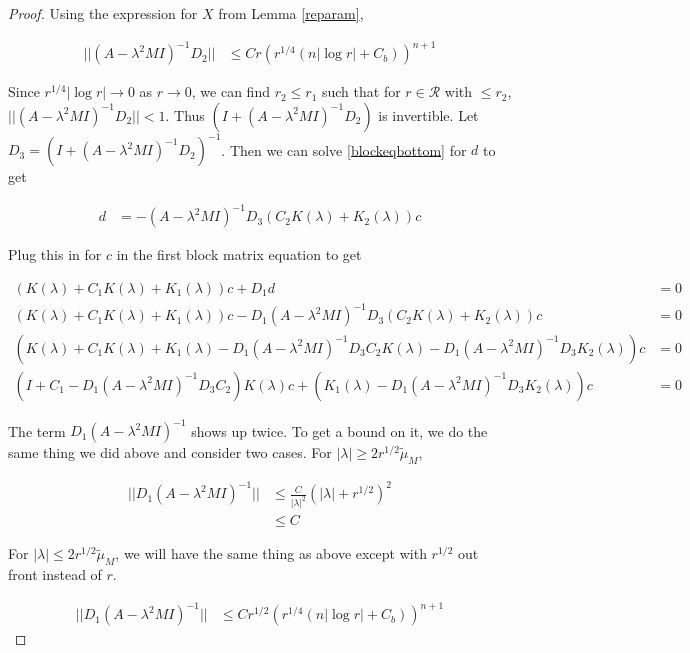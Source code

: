 \documentclass[thesis.tex]{subfiles}
\begin{document}
\begin{lemma}
\begin{proof}
Using the expression for $X$ from Lemma \ref{reparam}, 

\begin{align*}
|| (A - \lambda^2 MI)^{-1} D_2 ||
&\leq C r \left( r^{1/4} (n |\log r| + C_b )\right)^{n+1}
\end{align*}

Since $r^{1/4} |\log r| \rightarrow 0$ as $r \rightarrow 0$, we can find $r_2 \leq r_1$ such that for $r \in \mathcal{R}$ with $\leq r_2$, $|| (A - \lambda^2 MI)^{-1} D_2 || < 1$. Thus $(I + (A - \lambda^2 MI)^{-1} D_2)$ is invertible. Let $D_3 = (I + (A - \lambda^2 MI)^{-1} D_2)^{-1}$. Then we can solve \eqref{blockeqbottom} for $d$ to get

\begin{align*}
d &= -(A - \lambda^2 MI)^{-1} D_3 (C_2 K(\lambda) + K_2(\lambda))c
\end{align*}

Plug this in for $c$ in the first block matrix equation to get

\begin{align*}
(K(\lambda) + C_1 K(\lambda) + K_1(\lambda))c + D_1 d &= 0 \\
(K(\lambda) + C_1 K(\lambda) + K_1(\lambda))c - D_1 (A - \lambda^2 MI)^{-1} D_3 (C_2 K(\lambda) + K_2(\lambda))c &= 0 \\
(K(\lambda) + C_1 K(\lambda) + K_1(\lambda) - D_1 (A - \lambda^2 MI)^{-1} D_3 C_2 K(\lambda) - D_1 (A - \lambda^2 MI)^{-1} D_3 K_2(\lambda))c &= 0 \\
(I + C_1 - D_1 (A - \lambda^2 MI)^{-1} D_3 C_2) K(\lambda)c + (K_1(\lambda) - D_1 (A - \lambda^2 MI)^{-1} D_3 K_2(\lambda))c &= 0
\end{align*}

The term $D_1 (A - \lambda^2 MI)^{-1}$ shows up twice. To get a bound on it, we do the same thing we did above and consider two cases. For $|\lambda| \geq 2 r^{1/2} \tilde{\mu}_M$,

\begin{align*}
|| D_1 (A - \lambda^2 MI)^{-1} || &\leq \frac{C}{|\lambda|^2} (|\lambda| + r^{1/2})^2 \\ 
&\leq C
\end{align*}

For $|\lambda| \leq 2 r^{1/2} \tilde{\mu}_M$, we will have the same thing as above except with $r^{1/2}$ out front instead of $r$.

\begin{align*}
|| D_1 (A - \lambda^2 MI)^{-1} || &\leq C r^{1/2} \left( r^{1/4} (n |\log r| + C_b )\right)^{n+1}
\end{align*}


\end{proof}
\end{lemma}
\end{document}
